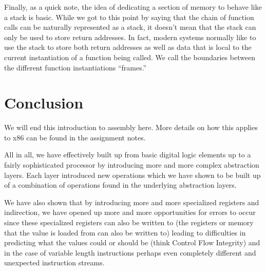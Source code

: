 Finally, as a quick note, the idea of dedicating a section of memory to behave like a stack is basic. While we got to this point by saying that the chain of function calls can be naturally represented as a stack, it doesn’t mean that the stack can only be used to store return addresses. In fact, modern systems normally like to use the stack to store both return addresses as well as data that is local to the current instantiation of a function being called. We call the boundaries between the different function instantiations “frames.” 

\section{Conclusion}
We will end this introduction to assembly here. More details on how this applies to x86 can be found in the assignment notes. 

All in all, we have effectively built up from basic digital logic elements up to a fairly sophisticated processor by introducing more and more complex abstraction layers. Each layer introduced new operations which we have shown to be built up of a combination of operations found in the underlying abstraction layers. 

We have also shown that by introducing more and more specialized registers and indirection, we have opened up more and more opportunities for errors to occur since these specialized registers can also be written to (the registers or memory that the value is loaded from can also be written to) leading to difficulties in predicting what the values could or should be (think Control Flow Integrity) and in the case of variable length instructions perhaps even completely different and unexpected instruction streams.

